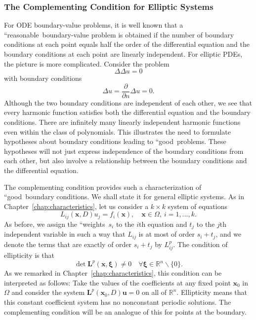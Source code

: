 \subsubsection{The Complementing Condition for Elliptic Systems}\label{subsec:elliptic-system-complementing-condition}

For ODE boundary-value problems, it is well known that a ``reasonable\textquotesingle\textquotesingle\ boundary-value problem is obtained if the number of boundary conditions at each point equals half the order of the differential equation and the boundary conditions at each point are linearly independent. For elliptic PDEs, the picture is more complicated. Consider the problem
\begin{equation}\label{eq:complementing-motivation-biharmonic-equation}
\Delta\Delta u=0
\end{equation}
with boundary conditions
\begin{equation}\label{eq:complementing-motivation-biharmonic-boundary}
\Delta u=\frac{\partial}{\partial n}\Delta u=0.
\end{equation}
Although the two boundary conditions are independent of each other, we see that every harmonic function satisfies both the differential equation and the boundary conditions. There are infinitely many linearly independent harmonic functions even within the class of polynomials. This illustrates the need to formulate hypotheses about boundary conditions leading to ``good\textquotesingle\textquotesingle\ problems. These hypotheses will not just express independence of the boundary conditions from each other, but also involve a relationship between the boundary conditions and the differential equation.

The complementing condition provides such a characterization of ``good\textquotesingle\textquotesingle\ boundary conditions. We shall state it for general elliptic systems. As in Chapter~\ref{chap:characteristics}, let us consider a $k\times k$ system of equations
\begin{equation}\label{eq:weighted-elliptic-general-system}
L_{ij}(\bm{x},D)u_j=f_i(\bm{x}),\quad\bm{x}\in\Omega,\ i=1,\ldots,k.
\end{equation}
As before, we assign the ``weights\textquotesingle\textquotesingle\ $s_i$ to the $i$th equation and $t_j$ to the $j$th independent variable in such a way that $L_{ij}$ is at most of order $s_i+t_j$, and we denote the terms that are exactly of order $s_i+t_j$ by $L_{ij}^p$. The condition of ellipticity is that
\begin{equation}\label{eq:weighted-elliptic-system-principal-determinant}
\det\bm{L}^p(\bm{x},\bm{\xi})\ne0\quad\forall\bm{\xi}\in\mathbb{R}^n\backslash\{0\}.
\end{equation}
As we remarked in Chapter~\ref{chap:characteristics}, this condition can be interpreted as follows: Take the values of the coefficients at any fixed point $\bm{x}_0$ in $\Omega$ and consider the system $\bm{L}^p(\bm{x}_0,D)\bm{u}=0$ on all of $\mathbb{R}^n$. Ellipticity means that this constant coefficient system has no nonconstant periodic solutions. The complementing condition will be an analogue of this for points at the boundary.

